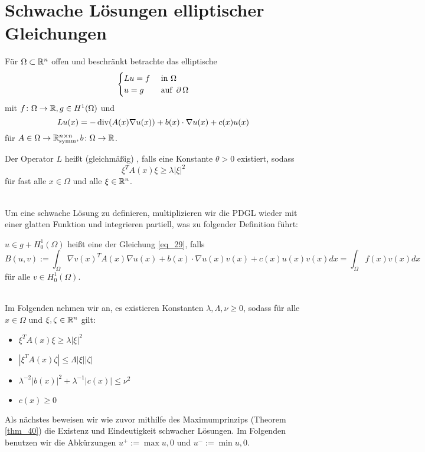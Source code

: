 \section{Schwache Lösungen elliptischer Gleichungen}
\label{sec:para9}
	Für $\Omega \subset \mathbb{R}^n$ offen und beschränkt betrachte das elliptische  
	\begin{equation}
		\begin{cases}
			Lu = f	& \text{ in } \Omega \\
			u = g	& \text{ auf } \operatorname{\partial} \Omega
		\end{cases} \label{eq_29}
	\end{equation}
	mit $f\colon \Omega \rightarrow \mathbb{R}, g \in H^1(\Omega)$ und
	\[ Lu(x) = -\operatorname{div} (A(x) \nabla u(x)) + b(x) \cdot \nabla u(x) + c(x) u(x) \]
	für $A \in \Omega \rightarrow \mathbb{R}_{\text{symm}}^{n\times n}, b\colon \Omega \rightarrow \mathbb{R}$.
	
\begin{defn}[Elliptizität] \label{def_64} 
	Der Operator $L$ heißt (gleichmäßig) , falls eine Konstante $\theta > 0$ existiert, sodass \marginnote{[64]}
	\[ \xi^T A(x) \xi \geq \lambda |\xi|^2 \]
	für fast alle $x \in \Omega$ und alle $\xi \in \mathbb{R}^n$.
\end{defn}
	
\mbox{} \\
Um eine schwache Lösung zu definieren, multiplizieren wir die PDGL wieder mit einer glatten Funktion und integrieren partiell, was zu folgender Definition führt:

\begin{defn} \label{def_65}
	$u \in g+ H_0^1(\Omega)$ heißt eine  der Gleichung \eqref{eq_29}, falls \marginnote{[65]}
	\begin{equation}
		B(u,v) := \int_{\Omega} \nabla v(x)^T A(x) \nabla u(x) + b(x) \cdot \nabla u(x) v(x) + c(x) u(x) v(x) dx = \int_\Omega f(x) v(x) dx \label{eq_30}
	\end{equation}
	für alle $v \in H_0^1(\Omega)$.
\end{defn}
	
\mbox{} \\
Im Folgenden nehmen wir an, es existieren Konstanten $\lambda, \Lambda, \nu \geq 0$, sodass für alle $x \in \Omega$ und $\xi,\zeta \in \mathbb{R}^n$ gilt:
\begin{itemize}
	\item $\xi^T A(x) \xi \geq \lambda |\xi|^2$
	\item $|\xi^T A(x) \zeta| \leq \Lambda |\xi| |\zeta|$
	\item $\lambda^{-2} |b(x)|^2 + \lambda^{-1}|c(x)| \leq \nu^2$
	\item $c(x) \geq 0$
\end{itemize}
Als nächstes beweisen wir wie zuvor mithilfe des Maximumprinzips (Theorem \ref{thm_40}) die Existenz und Eindeutigkeit schwacher Lösungen. Im Folgenden benutzen wir die Abkürzungen $u^+ := \max{u,0}$ und $u^- := \min{u,0}$.


